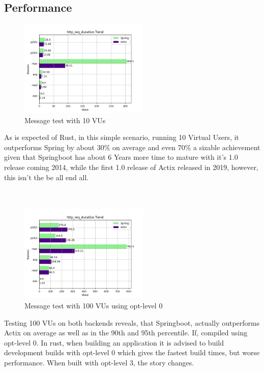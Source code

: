 \documentclass[a4paper,12pt]{article}
\begin{document}
	\subsection{Performance}
	\label{subsec:performance}
	\begin{figure}
		\includegraphics[width=0.55\textwidth]{messages_10_vu/http_req_duration.png}
		\caption{Message test with 10 VUs}
	\end{figure}
	As is expected of Rust, in this simple scenario, running 10 Virtual Users, it outperforms Spring by about 30\% on average and
	even 70\% a sizable achievement given that Springboot has about 6 Years more time to mature with it's 1.0 release coming 2014,
	while the first 1.0 release of Actix released in 2019, however, this isn't the be all end all. \\ \\ \\
	
	\begin{figure}
		\includegraphics[width=0.55\textwidth]{messages_100_vus/http_req_duration.png}
		\caption{Message test with 100 VUs using opt-level 0}
	\end{figure}
	Testing 100 VUs on both backends reveals, that Springboot, actually outperforms Actix on average as well as in the 90th and 95th
	percentile. If, compiled using opt-level 0. In rust, when building an application it is advised to build development builds with
	opt-level 0 which gives the fastest build times, but worse performance. When built with opt-level 3, the story changes.
	
\end{document}
